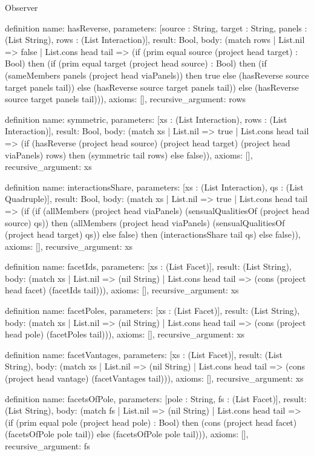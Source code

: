 \begin{lexlean}{Observer}
\begin{semanticmodule}
definition{
  name: hasReverse,
  parameters: [source : String, target : String, panels : (List String), rows : (List Interaction)],
  result: Bool,
  body: (match rows
    | List.nil => false
    | List.cons head tail => (if (prim equal source (project head target) : Bool) then (if (prim equal target (project head source) : Bool) then (if (sameMembers panels (project head viaPanels)) then true else (hasReverse source target panels tail)) else (hasReverse source target panels tail)) else (hasReverse source target panels tail))),
  axioms: [],
  recursive_argument: rows
}

definition{
  name: symmetric,
  parameters: [xs : (List Interaction), rows : (List Interaction)],
  result: Bool,
  body: (match xs
    | List.nil => true
    | List.cons head tail => (if (hasReverse (project head source) (project head target) (project head viaPanels) rows) then (symmetric tail rows) else false)),
  axioms: [],
  recursive_argument: xs
}

definition{
  name: interactionsShare,
  parameters: [xs : (List Interaction), qs : (List Quadruple)],
  result: Bool,
  body: (match xs
    | List.nil => true
    | List.cons head tail => (if (if (allMembers (project head viaPanels) (sensualQualitiesOf (project head source) qs)) then (allMembers (project head viaPanels) (sensualQualitiesOf (project head target) qs)) else false) then (interactionsShare tail qs) else false)),
  axioms: [],
  recursive_argument: xs
}

definition{
  name: facetIds,
  parameters: [xs : (List Facet)],
  result: (List String),
  body: (match xs
    | List.nil => (nil String)
    | List.cons head tail => (cons (project head facet) (facetIds tail))),
  axioms: [],
  recursive_argument: xs
}

definition{
  name: facetPoles,
  parameters: [xs : (List Facet)],
  result: (List String),
  body: (match xs
    | List.nil => (nil String)
    | List.cons head tail => (cons (project head pole) (facetPoles tail))),
  axioms: [],
  recursive_argument: xs
}

definition{
  name: facetVantages,
  parameters: [xs : (List Facet)],
  result: (List String),
  body: (match xs
    | List.nil => (nil String)
    | List.cons head tail => (cons (project head vantage) (facetVantages tail))),
  axioms: [],
  recursive_argument: xs
}

definition{
  name: facetsOfPole,
  parameters: [pole : String, fs : (List Facet)],
  result: (List String),
  body: (match fs
    | List.nil => (nil String)
    | List.cons head tail => (if (prim equal pole (project head pole) : Bool) then (cons (project head facet) (facetsOfPole pole tail)) else (facetsOfPole pole tail))),
  axioms: [],
  recursive_argument: fs
}


\end{semanticmodule}
\end{lexlean}
